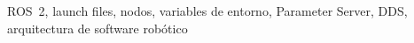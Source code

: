 \begin{IEEEkeywords}
ROS~2, launch files, nodos, variables de entorno, Parameter Server, DDS, arquitectura de software robótico
\end{IEEEkeywords}
